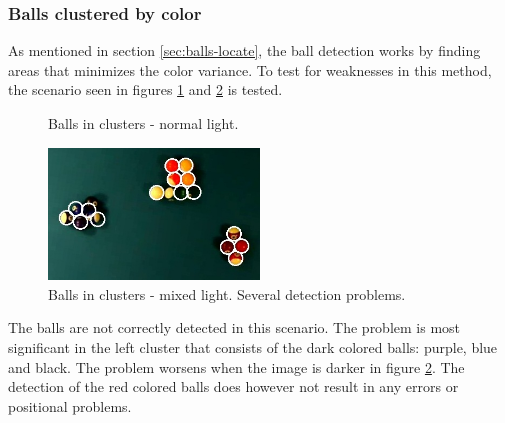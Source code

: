 \subsubsection{Balls clustered by color}
As mentioned in section \ref{sec:balls-locate}, the ball detection works by finding areas that minimizes the color variance. To test for weaknesses in this method, the scenario seen in figures \ref{fig:clustersnormal} and \ref{fig:clustersmixed} is tested.
\begin{figure}[H]
  \centering
  \quad
	\quad
   \caption{Balls in clusters - normal light.}
  \label{fig:clustersnormal}
\end{figure}

\begin{figure}[H]
  \centering
\includegraphics[width=0.5\textwidth]{images/test/mixed1/clusters-2}
   \caption{Balls in clusters - mixed light. Several detection problems.}
  \label{fig:clustersmixed}
\end{figure}
The balls are not correctly detected in this scenario. The problem is most significant in the left cluster that consists of the dark colored balls: purple, blue and black. The problem worsens when the image is darker in figure \ref{fig:clustersmixed}. The detection of the red colored balls does however not result in any errors or positional problems. 


